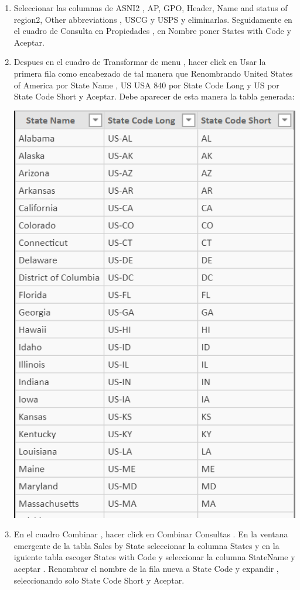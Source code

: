 \begin{itemize}
\begin{enumerate}
\item Seleccionar las columnas de ASNI2 , AP, GPO, Header, Name and status of region2, Other abbreviations , USCG y USPS y eliminarlas. Seguidamente en el cuadro de Consulta en Propiedades , en Nombre poner States with Code y Aceptar.
\item Despues  en el cuadro de Transformar de menu , hacer click en Usar la primera fila como encabezado de tal manera que Renombrando United States of America por State Name , US USA 840 por State Code Long y US por State Code Short y Aceptar. Debe aparecer de esta manera la tabla generada:
\begin{center}
\includegraphics[scale=1]{./Imagenes/tarea3_renombrartablas.png}
\end{center}

\item En el cuadro  Combinar , hacer click en Combinar Consultas . En la ventana emergente de la tabla Sales by State seleccionar la columna States y en la iguiente tabla escoger States with Code y seleccionar la columna StateName y aceptar . Renombrar el nombre de la fila  nueva a State Code y expandir , seleccionando solo State Code Short y Aceptar.


\end{enumerate}
\end{itemize}
